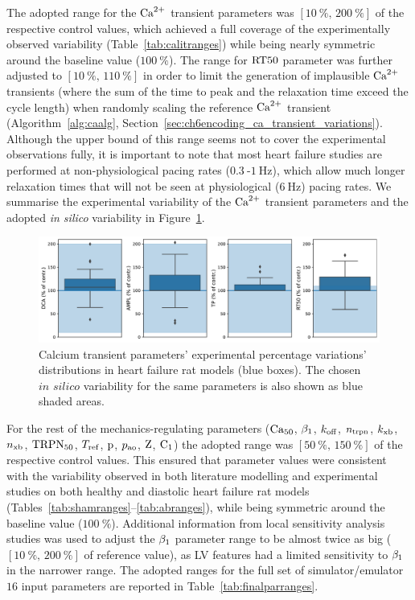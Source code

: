 \vspace{0.2cm}\noindent
The adopted range for the $\textrm{Ca}^{2+}$ transient parameters was $[\SI{10}{\percent},\,\SI{200}{\percent}]$ of the respective control values, which achieved a full coverage of the experimentally observed variability (Table~\ref{tab:calitranges}) while being nearly symmetric around the baseline value ($\SI{100}{\percent}$). The range for $\textrm{RT50}$ parameter was further adjusted to $[\SI{10}{\percent},\,\SI{110}{\percent}]$ in order to limit the generation of implausible $\textrm{Ca}^{2+}$ transients (where the sum of the time to peak and the relaxation time exceed the cycle length) when randomly scaling the reference $\textrm{Ca}^{2+}$ transient (Algorithm~\ref{alg:caalg}, Section~\ref{sec:ch6encoding_ca_transient_variations}). Although the upper bound of this range seems not to cover the experimental observations fully, it is important to note that most heart failure studies are performed at non-physiological pacing rates ($\SI{0.3}{}$-$\SI{1}{\hertz}$), which allow much longer relaxation times that will not be seen at physiological ($\SI{6}{\hertz}$) pacing rates. We summarise the experimental variability of the $\textrm{Ca}^{2+}$ transient parameters and the adopted \textit{in silico} variability in Figure~\ref{fig:calitdistr}.

\begin{figure}[ht!]
    \myfloatalign
    \includegraphics[width=\textwidth]{figures/chapter07/ca_literature_review_all_studies.pdf}
    \caption{Calcium transient parameters' experimental percentage variations' distributions in heart failure rat models (blue boxes). The chosen $\textit{in silico}$ variability for the same parameters is also shown as blue shaded areas.}
    \label{fig:calitdistr}
\end{figure}

\vspace{0.2cm}
For the rest of the mechanics-regulating parameters ($\textrm{Ca}_{50}$, $\beta_1$, $k_{\textrm{off}}$, $n_{\textrm{trpn}}$, $k_{\textrm{xb}}$, $n_{\textrm{xb}}$, $\textrm{TRPN}_{50}$, $T_{\textrm{ref}}$, $\textrm{p}$, $p_{\textrm{ao}}$, $\textrm{Z}$, $\textrm{C}_1$) the adopted range was $[\SI{50}{\percent},\,\SI{150}{\percent}]$ of the respective control values. This ensured that parameter values were consistent with the variability observed in both literature modelling and experimental studies on both healthy and diastolic heart failure rat models (Tables~\ref{tab:shamranges}--\ref{tab:abranges}), while being symmetric around the baseline value ($\SI{100}{\percent}$). Additional information from local sensitivity analysis studies was used to adjust the $\beta_1$ parameter range to be almost twice as big ($[\SI{10}{\percent},\,\SI{200}{\percent}]$ of reference value), as LV features had a limited sensitivity to $\beta_1$ in the narrower range. The adopted ranges for the full set of simulator/emulator $16$ input parameters are reported in Table~\ref{tab:finalparranges}.

